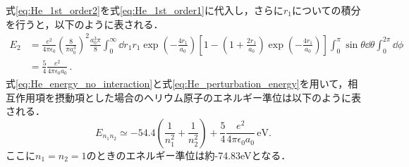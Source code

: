 \documentclass[a4paper,dvipdfmx,10.5pt]{jarticle}
\begin{document}
式\eqref{eq:He_1st_order2}を式\eqref{eq:He_1st_order1}に代入し，さらに$r_1$についての積分を行うと，以下のように表される．
\begin{align}
  E_2 &= \frac{e^2}{4\pi \epsilon_0} \left( \frac{8}{\pi a_0^3}\right)^2 \frac{a_0^3\pi}{8} \int_0^\infty \dd{r_1} r_1 \exp\left(-\frac{4r_1}{a_0}\right) \left[1-\left(1+\frac{2r_1}{a_0}\right)\exp(-\frac{4r_1}{a_0})\right]\int_0^{\pi}\sin\theta\dd{\theta}\int_{0}^{2\pi} \dd{\phi} \\
  &= \frac{5}{4} \frac{e^2}{4\pi \epsilon_0 a_0} \,.\label{eq:He_perturbation_energy}
\end{align}
式\eqref{eq:He_energy_no_interaction}と式\eqref{eq:He_perturbation_energy}を用いて，相互作用項を摂動項とした場合のヘリウム原子のエネルギー準位は以下のように表される．
\begin{equation}
  E_{n_1 n_2} \simeq -54.4 \left( \frac{1}{n_1^2} + \frac{1}{n_2^2} \right) + \frac{5}{4} \frac{e^2}{4\pi \epsilon_0 a_0} \, \text{eV}.\label{eq:He_energy_first_order}
\end{equation}
ここに$n_1=n_2=1$のときのエネルギー準位は約-74.83eVとなる．
\end{document}
